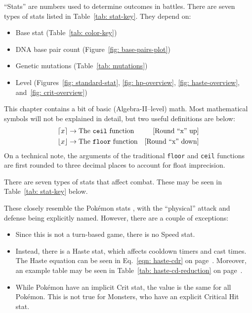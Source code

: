
\def\tableWidth{0.5\textwidth}

\begin{tldr}
``Stats'' are numbers used to determine outcomes in battles. There are seven types of stats listed in Table~\ref{tab: stat-key}. They depend on:

\begin{itemize}
	\item{Base stat (Table~\ref{tab: color-key})}
	\item{DNA base pair count (Figure~\ref{fig: base-pairs-plot})}
	\item{Genetic mutations (Table~\ref{tab: mutations})}
	\item{Level (Figures~\ref{fig: standard-stat}, \ref{fig: hp-overview}, \ref{fig: haste-overview}, and~\ref{fig: crit-overview})}
\end{itemize}

\end{tldr}



This chapter contains a bit of basic (Algebra-II--level) math. Most mathematical symbols will not be explained in detail, but two useful definitions are below:
\begin{align*}
	\lceil x\rceil &\rightarrow \text{The \texttt{ceil} function} & \text{[Round ``x'' up]}\\
	\lfloor x\rfloor &\rightarrow \text{The \texttt{floor} function} & \text{[Round ``x'' down]}\\
\end{align*}
\noindent On a technical note, the arguments of the traditional \texttt{floor} and \texttt{ceil} functions are first rounded to three decimal places to account for float imprecision.

There are seven types of stats that affect combat. These may be seen in Table~\ref{tab: stat-key} below. 

		
\noindent These closely resemble the Pok\'{e}mon stats \cite{pkmn-stats}, with the ``physical'' attack and defense being explicitly named. However, there are a couple of exceptions:

\begin{itemize}
	\item{Since this is not a turn-based game, there is no Speed stat.}
	\item{Instead, there is a Haste stat, which affects cooldown timers and cast times. The Haste equation can be seen in Eq.~\eqref{eqn: haste-cdr} on page~\pageref{eqn: haste-cdr}. Moreover, an example table may be seen in Table~\ref{tab: haste-cd-reduction} on page~\pageref{tab: haste-cd-reduction}.}
	\item{While Pok\'{e}mon have an implicit Crit stat, the value is the same for all Pok\'{e}mon. This is not true for Monsters, who have an explicit Critical Hit stat.}
\end{itemize}

